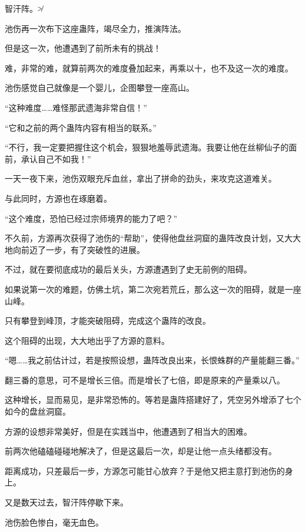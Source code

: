 
\begin{this_body}

智汗阵。≯

池伤再一次布下这座蛊阵，竭尽全力，推演阵法。

但是这一次，他遭遇到了前所未有的挑战！

难，非常的难，就算前两次的难度叠加起来，再乘以十，也不及这一次的难度。

池伤感觉自己就像是一个婴儿，企图攀登一座高山。

“这种难度……难怪那武遗海非常自信！”

“它和之前的两个蛊阵内容有相当的联系。”

“不行，我一定要把握住这个机会，狠狠地羞辱武遗海。我要让他在丝柳仙子的面前，承认自己不如我！”

一天一夜下来，池伤双眼充斥血丝，拿出了拼命的劲头，来攻克这道难关。

与此同时，方源也在琢磨着。

“这个难度，恐怕已经过宗师境界的能力了吧？”

不久前，方源再次获得了池伤的“帮助”，使得他盘丝洞窟的蛊阵改良计划，又大大地向前迈了一步，有了突破性的进展。

不过，就在要彻底成功的最后关头，方源遭遇到了史无前例的阻碍。

如果说第一次的难题，仿佛土坑，第二次宛若荒丘，那么这一次的阻碍，就是一座山峰。

只有攀登到峰顶，才能突破阻碍，完成这个蛊阵的改良。

这个阻碍的出现，大大地出乎了方源的意料。

“嗯……我之前估计过，若是按照设想，蛊阵改良出来，长恨蛛群的产量能翻三番。”

翻三番的意思，可不是增长三倍。而是增长了七倍，即是原来的产量乘以八。

这种增长，显而易见，是非常恐怖的。等若是蛊阵搭建好了，凭空另外增添了七个如今的盘丝洞窟。

方源的设想非常美好，但是在实践当中，他遭遇到了相当大的困难。

前两次他磕磕碰碰地解决了，但是这最后一次，却是让他一点头绪都没有。

距离成功，只差最后一步，方源怎可能甘心放弃？于是他又把主意打到池伤的身上。

又是数天过去，智汗阵停歇下来。

池伤脸色惨白，毫无血色。


\end{this_body}
